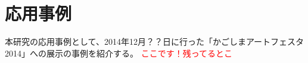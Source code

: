 \section{応用事例}%
\label{SKagoshima}

本研究の応用事例として、2014年12月？？日に行った「かごしまアートフェスタ2014」への展示の事例を紹介する。
\textcolor{red}{ここです！残ってるとこ}






